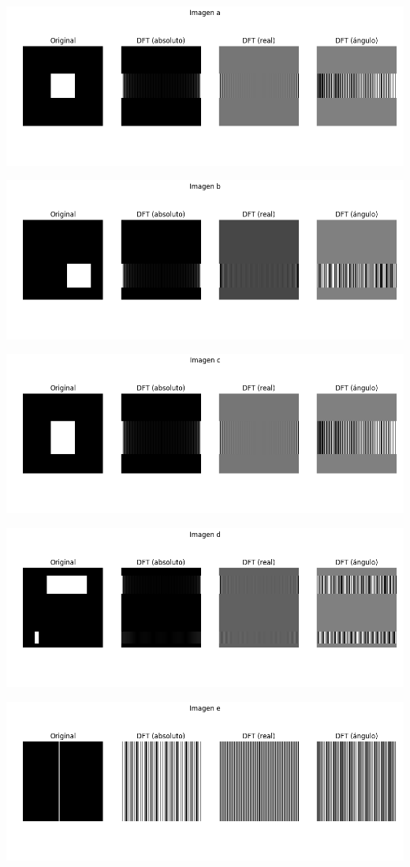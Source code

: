 \documentclass[a4paper]{article}
\begin{document}
\begin{center}

\includegraphics[scale=0.4]{imgs/3-a.png}

\includegraphics[scale=0.4]{imgs/3-b.png}

\includegraphics[scale=0.4]{imgs/3-c.png}

\includegraphics[scale=0.4]{imgs/3-d.png}

\includegraphics[scale=0.4]{imgs/3-e.png}


\end{center}
\end{document}
